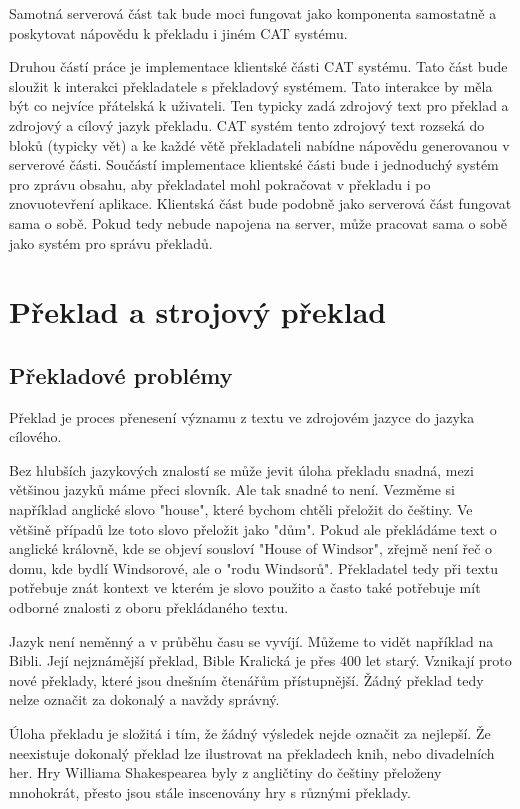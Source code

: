 \documentclass[12pt,a4paper]{report}
\begin{document}
Samotná serverová část tak bude moci fungovat jako komponenta samostatně a poskytovat nápovědu k překladu i jiném CAT systému.

Druhou částí práce je implementace klientské části CAT systému. Tato část bude sloužit k interakci překladatele s překladový systémem. Tato interakce by měla být co nejvíce přátelská k uživateli. Ten typicky zadá zdrojový text pro překlad a zdrojový a cílový jazyk překladu. CAT systém tento zdrojový text rozseká do bloků (typicky vět) a ke každé větě překladateli nabídne nápovědu generovanou v serverové části. Součástí implementace klientské části bude i jednoduchý systém pro zprávu obsahu, aby překladatel mohl pokračovat v překladu i po znovuotevření aplikace. Klientská část bude podobně jako serverová část fungovat sama o sobě. Pokud tedy nebude napojena na server, může pracovat sama o sobě jako systém pro správu překladů.




\chapter{Překlad a strojový překlad}

\section{Překladové problémy}

Překlad je proces přenesení významu z textu ve zdrojovém jazyce do jazyka cílového.

Bez hlubších jazykových znalostí se může jevit úloha překladu snadná, mezi většinou jazyků máme přeci slovník. Ale tak snadné to není. Vezměme si například anglické slovo "house", které bychom chtěli přeložit do češtiny. Ve většině případů lze toto slovo přeložit jako "dům". Pokud ale překládáme text o anglické královně, kde se objeví sousloví "House of Windsor", zřejmě není řeč o domu, kde bydlí Windsorové, ale o "rodu Windsorů". Překladatel tedy při textu potřebuje znát kontext ve kterém je slovo použito a často také potřebuje mít odborné znalosti z oboru překládaného textu.

Jazyk není neměnný a v průběhu času se vyvíjí. Můžeme to vidět například na Bibli. Její nejznámější překlad, Bible Kralická je přes 400 let starý. Vznikají proto nové překlady, které jsou dnešním čtenářům přístupnější. Žádný překlad tedy nelze označit za dokonalý a navždy správný.

Úloha překladu je složitá i tím, že žádný výsledek nejde označit za nejlepší. Že neexistuje dokonalý překlad lze ilustrovat na překladech knih, nebo divadelních her. Hry Williama Shakespearea byly z angličtiny do češtiny přeloženy mnohokrát, přesto jsou stále inscenovány hry s různými překlady.
\end{document}
